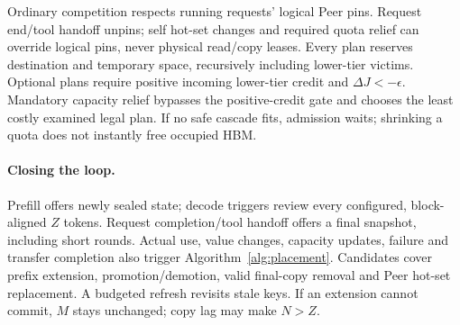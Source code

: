 Ordinary competition respects running requests' logical Peer pins.
Request end/tool handoff unpins; self hot-set changes and required quota
relief can override logical pins, never physical read/copy leases.
Every plan reserves destination and temporary space, recursively including
lower-tier victims. Optional plans require positive incoming lower-tier
credit and $\Delta J<-\epsilon$. Mandatory capacity relief bypasses the
positive-credit gate and chooses the least costly examined legal plan.
If no safe cascade fits, admission waits; shrinking a quota does not
instantly free occupied HBM.

\paragraph{Closing the loop.}
Prefill offers newly sealed state; decode triggers review every configured,
block-aligned $Z$ tokens. Request completion/tool handoff offers a final
snapshot, including short rounds. Actual use, value changes, capacity
updates, failure and transfer completion also trigger Algorithm~\ref{alg:placement}.
Candidates cover prefix extension, promotion/demotion, valid final-copy
removal and Peer hot-set replacement. A budgeted refresh revisits stale
keys. If an extension cannot commit, $M$ stays unchanged; copy lag may
make $N>Z$.

